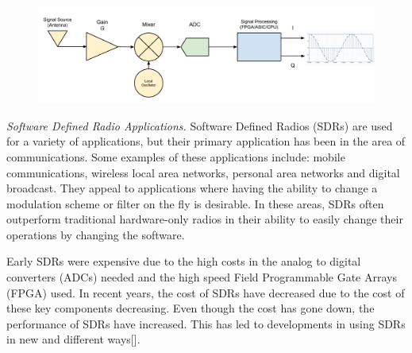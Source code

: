 
{\begin{figure}[h!tb] 
\centering
\includegraphics[width=\textwidth]{Images/SDR_Prac_block.pdf}
\label{prac_sdr}
\end{figure}
}

\emph{Software Defined Radio Applications.}  Software Defined Radios (SDRs) are used for a variety of applications, but their primary application has been in the area of communications.  Some examples of these applications include:  mobile communications, wireless local area networks, personal area networks and digital broadcast.  They appeal to applications where having the ability to change a modulation scheme or filter on the fly is desirable.  In these areas, SDRs often outperform traditional hardware-only radios in their ability to easily change their operations by changing the software.  

Early SDRs were expensive due to the high costs in the analog to digital converters (ADCs) needed and the high speed Field Programmable Gate Arrays (FPGA) used.  In recent years, the cost of SDRs have decreased due to the cost of these key components decreasing.  Even though the cost has gone down, the performance of SDRs have increased.  This has led to developments in using SDRs in new and different ways[\cite{jondral2005software}].


